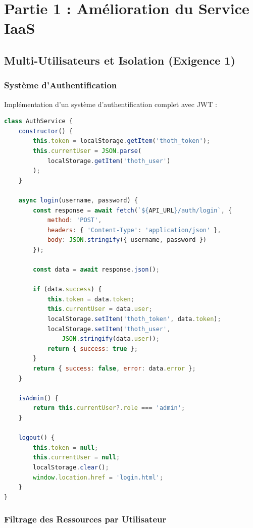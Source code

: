 \documentclass[12pt,a4paper]{article}
\begin{document}
\section{Partie 1 : Amélioration du Service IaaS}

\subsection{Multi-Utilisateurs et Isolation (Exigence 1)}

\subsubsection{Système d'Authentification}

Implémentation d'un système d'authentification complet avec JWT :

\begin{lstlisting}[language=JavaScript,caption=Service d'authentification (auth.js)]
class AuthService {
    constructor() {
        this.token = localStorage.getItem('thoth_token');
        this.currentUser = JSON.parse(
            localStorage.getItem('thoth_user')
        );
    }
    
    async login(username, password) {
        const response = await fetch(`${API_URL}/auth/login`, {
            method: 'POST',
            headers: { 'Content-Type': 'application/json' },
            body: JSON.stringify({ username, password })
        });
        
        const data = await response.json();
        
        if (data.success) {
            this.token = data.token;
            this.currentUser = data.user;
            localStorage.setItem('thoth_token', data.token);
            localStorage.setItem('thoth_user', 
                JSON.stringify(data.user));
            return { success: true };
        }
        return { success: false, error: data.error };
    }
    
    isAdmin() {
        return this.currentUser?.role === 'admin';
    }
    
    logout() {
        this.token = null;
        this.currentUser = null;
        localStorage.clear();
        window.location.href = 'login.html';
    }
}
\end{lstlisting}

\subsubsection{Filtrage des Ressources par Utilisateur}
\end{document}
